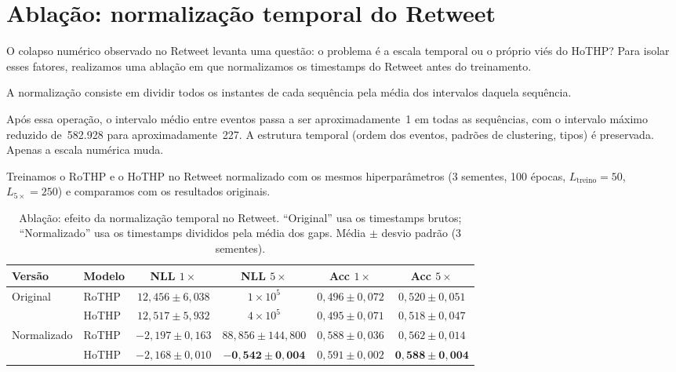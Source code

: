 \section{Ablação: normalização temporal do Retweet}
\label{sec:ablacao-retweet}

O colapso numérico observado no Retweet levanta uma questão: o problema é a escala temporal ou o próprio viés do HoTHP? Para isolar esses fatores, realizamos uma ablação em que normalizamos os timestamps do Retweet antes do treinamento.

A normalização consiste em dividir todos os instantes de cada sequência pela média dos intervalos daquela sequência.

Após essa operação, o intervalo médio entre eventos passa a ser aproximadamente~1 em todas as sequências, com o intervalo máximo reduzido de~582.928 para aproximadamente~227. A estrutura temporal (ordem dos eventos, padrões de clustering, tipos) é preservada. Apenas a escala numérica muda.

Treinamos o RoTHP e o HoTHP no Retweet normalizado com os mesmos hiperparâmetros (3 sementes, 100 épocas, $L_{\text{treino}} = 50$, $L_{5\times} = 250$) e comparamos com os resultados originais.

\begin{table}[h!]
\centering
\caption{Ablação: efeito da normalização temporal no Retweet. ``Original'' usa os timestamps brutos; ``Normalizado'' usa os timestamps divididos pela média dos gaps. Média $\pm$ desvio padrão (3 sementes).}
\label{tab:ablacao-retweet}
\begin{tabular}{llcccc}
\toprule
Versão & Modelo & NLL $1\times$ & NLL $5\times$ & Acc $1\times$ & Acc $5\times$ \\
\midrule
\multirow{2}{*}{Original}
    & RoTHP  & $12{,}456 \pm 6{,}038$ & $1 \times 10^{5}$ & $0{,}496 \pm 0{,}072$ & $0{,}520 \pm 0{,}051$ \\
    & HoTHP  & $12{,}517 \pm 5{,}932$ & $4 \times 10^{5}$ & $0{,}495 \pm 0{,}071$ & $0{,}518 \pm 0{,}047$ \\
\midrule
\multirow{2}{*}{Normalizado}
    & RoTHP  & $-2{,}197 \pm 0{,}163$ & $88{,}856 \pm 144{,}800$ & $0{,}588 \pm 0{,}036$ & $0{,}562 \pm 0{,}014$ \\
    & HoTHP  & $-2{,}168 \pm 0{,}010$ & $\mathbf{-0{,}542 \pm 0{,}004}$ & $0{,}591 \pm 0{,}002$ & $\mathbf{0{,}588 \pm 0{,}004}$ \\
\bottomrule
\end{tabular}
\end{table}

